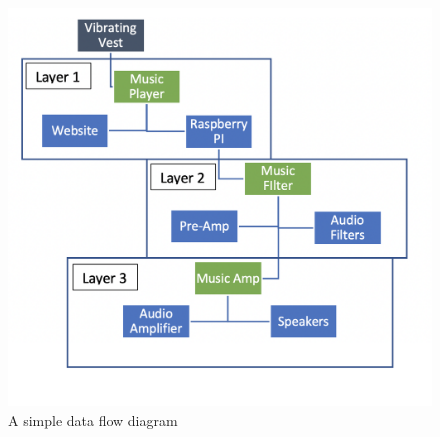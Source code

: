 \begin{figure}[h!]
	\centering
 	\includegraphics[width=\textwidth]{images/data_flow}
 \caption{A simple data flow diagram}
\end{figure}
